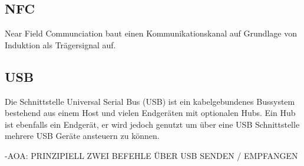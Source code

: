 	\subsection{NFC}
	
	Near Field Communciation baut einen Kommunikationskanal auf Grundlage von Induktion als Trägersignal auf.
	
	\subsection{USB}
	Die Schnittstelle Universal Serial Bus (USB) ist ein kabelgebundenes Bussystem bestehend aus einem Host und vielen Endgeräten mit optionalen Hubs. Ein Hub ist ebenfalls ein Endgerät, er wird jedoch genutzt um über eine USB Schnittstelle mehrere USB Geräte ansteuern zu können.  

-AOA: PRINZIPIELL ZWEI BEFEHLE ÜBER USB SENDEN / EMPFANGEN
